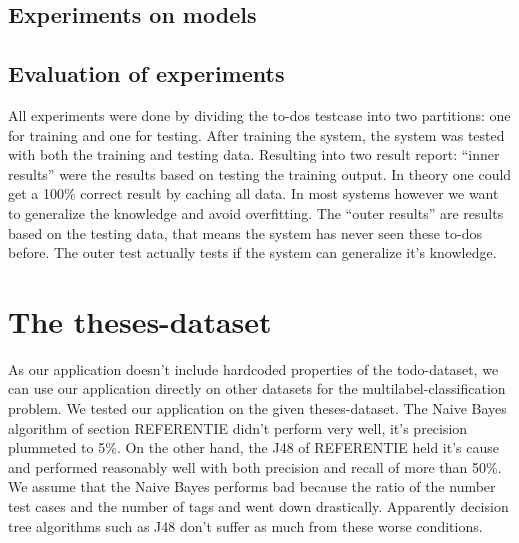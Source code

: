 \documentclass[a4paper,titlepage]{article}
\begin{document}
\subsection{Experiments on models}
\subsection{Evaluation of experiments}
All experiments were done by dividing the to-dos testcase into two partitions: one for training and one for testing. After training the system, the system was tested with both the training and testing data. Resulting into two result report: ``inner results'' were the results based on testing the training output. In theory one could get a 100\% correct result by caching all data. In most systems however we want to generalize the knowledge and avoid overfitting. The ``outer results'' are results based on the testing data, that means the system has never seen these to-dos before. The outer test actually tests if the system can generalize it's knowledge.

\section{The theses-dataset}
As our application doesn't include hardcoded properties of the todo-dataset, we can use our application directly on other datasets for the multilabel-classification problem. We tested our application on the given theses-dataset. The Naive Bayes algorithm of section REFERENTIE didn't perform very well, it's precision plummeted to 5\%. On the other hand, the J48 of REFERENTIE held it's cause and performed reasonably well with both precision and recall of more than 50\%. 
We assume that the Naive Bayes performs bad because the ratio of  the number test cases  and the number of tags and went down drastically. Apparently decision tree algorithms such as J48 don't suffer as much from these worse conditions. 
\end{document}
